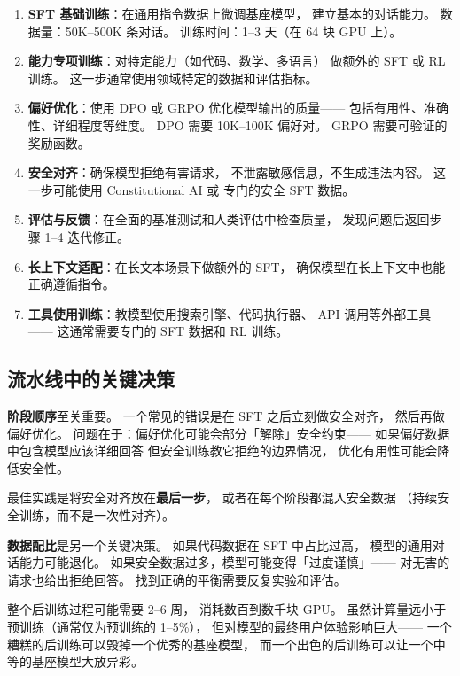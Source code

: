 \begin{enumerate}[noitemsep]
  \item \textbf{SFT 基础训练}：在通用指令数据上微调基座模型，
        建立基本的对话能力。
        数据量：50K--500K 条对话。
        训练时间：1--3 天（在 64 块 GPU 上）。
  \item \textbf{能力专项训练}：对特定能力（如代码、数学、多语言）
        做额外的 SFT 或 RL 训练。
        这一步通常使用领域特定的数据和评估指标。
  \item \textbf{偏好优化}：使用 DPO 或 GRPO 优化模型输出的质量——
        包括有用性、准确性、详细程度等维度。
        DPO 需要 10K--100K 偏好对。
        GRPO 需要可验证的奖励函数。
  \item \textbf{安全对齐}：确保模型拒绝有害请求，
        不泄露敏感信息，不生成违法内容。
        这一步可能使用 Constitutional AI 或
        专门的安全 SFT 数据。
  \item \textbf{评估与反馈}：在全面的基准测试和人类评估中检查质量，
        发现问题后返回步骤 1--4 迭代修正。
  \item \textbf{长上下文适配}：在长文本场景下做额外的 SFT，
        确保模型在长上下文中也能正确遵循指令。
  \item \textbf{工具使用训练}：教模型使用搜索引擎、代码执行器、
        API 调用等外部工具——
        这通常需要专门的 SFT 数据和 RL 训练。
\end{enumerate}

\subsection{流水线中的关键决策}

\textbf{阶段顺序}至关重要。
一个常见的错误是在 SFT 之后立刻做安全对齐，
然后再做偏好优化。
问题在于：偏好优化可能会部分「解除」安全约束——
如果偏好数据中包含模型应该详细回答
但安全训练教它拒绝的边界情况，
优化有用性可能会降低安全性。

最佳实践是将安全对齐放在\textbf{最后一步}，
或者在每个阶段都混入安全数据
（持续安全训练，而不是一次性对齐）。

\textbf{数据配比}是另一个关键决策。
如果代码数据在 SFT 中占比过高，
模型的通用对话能力可能退化。
如果安全数据过多，模型可能变得「过度谨慎」——
对无害的请求也给出拒绝回答。
找到正确的平衡需要反复实验和评估。

整个后训练过程可能需要 2--6 周，
消耗数百到数千块 GPU。
虽然计算量远小于预训练（通常仅为预训练的 1--5\%），
但对模型的最终用户体验影响巨大——
一个糟糕的后训练可以毁掉一个优秀的基座模型，
而一个出色的后训练可以让一个中等的基座模型大放异彩。

